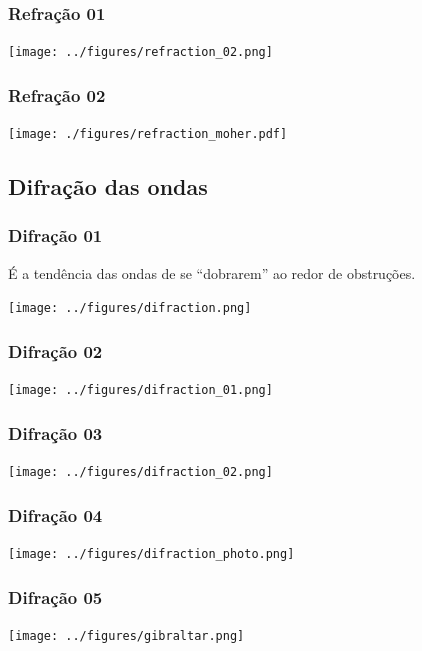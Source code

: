 \begin{frame}
\frametitle{Refração 01}
  \begin{center}
    \texttt{[image: ../figures/refraction\_02.png]}
  \end{center}
\end{frame}


\begin{frame}
\frametitle{Refração 02}
  \begin{center}
    \texttt{[image: ./figures/refraction\_moher.pdf]}
  \end{center}
\end{frame}


\subsection{Difração das ondas}
\begin{frame}
\frametitle{Difração 01}
  {\scriptsize É a tendência das ondas de se ``dobrarem'' ao redor de
               obstruções.}
  \begin{center}
    \texttt{[image: ../figures/difraction.png]}
  \end{center}
\end{frame}


\begin{frame}
\frametitle{Difração 02}
  \begin{center}
    \texttt{[image: ../figures/difraction\_01.png]}
  \end{center}
\end{frame}


\begin{frame}
\frametitle{Difração 03}
  \begin{center}
    \texttt{[image: ../figures/difraction\_02.png]}
  \end{center}
\end{frame}


\begin{frame}
\frametitle{Difração 04}
\begin{center}
  \texttt{[image: ../figures/difraction\_photo.png]}
\end{center}
\end{frame}


\begin{frame}
\frametitle{Difração 05}
\begin{center}
  \texttt{[image: ../figures/gibraltar.png]}
\end{center}
\end{frame}


